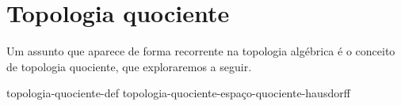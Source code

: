 \section{Topologia quociente}
\label{topologia-quociente}
Um assunto que aparece de forma recorrente na topologia algébrica é o conceito de topologia quociente, que exploraremos a seguir. 

{topologia-quociente-def}%
{topologia-quociente-espaço-quociente-hausdorff}

